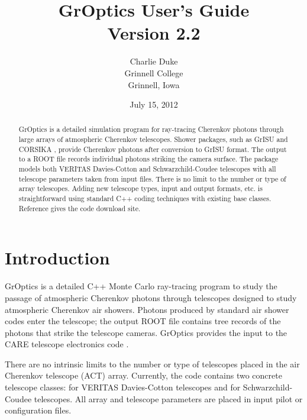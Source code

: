 \documentclass{article}
\begin{document}
\title{GrOptics User's Guide \\ Version 2.2}
\author{Charlie Duke \\
Grinnell College \\
Grinnell, Iowa }

\date{July 15, 2012}

\maketitle
\begin{abstract}

GrOptics is a detailed simulation program for ray-tracing Cherenkov photons
through large arrays of atmospheric Cherenkov telescopes. Shower packages, such
as GrISU \cite{GRISU} and CORSIKA \cite{CORSIKA}, provide Cherenkov 
photons after conversion to GrISU format. 
The output to a ROOT file records
individual photons striking the camera surface.  The package models
both VERITAS Davies-Cotton and Schwarzchild-Coudee telescopes with all
telescope parameters taken from input files. There is no limit to the number
or type of array telescopes. Adding new telescope types, input and
output formats, etc. is 
straightforward using standard C++ coding techniques with existing base
classes. Reference \cite{GROPTICS} gives the code download site.
       
\end{abstract}
\section{Introduction}\label{S:INTRO}
GrOptics is a detailed C++ Monte Carlo ray-tracing program to 
study the passage of 
atmospheric Cherenkov photons through telescopes designed to study 
atmospheric Cherenkov air showers.  
Photons produced by standard air shower 
codes enter the telescope; the output 
ROOT file contains tree records of the photons that strike the telescope
cameras.  GrOptics provides the input to the CARE  telescope 
electronics code \cite{CARE}.

There are no intrinsic limits to the number or type of telescopes placed in 
the air Cherenkov telescope (ACT) array. Currently, the code contains two 
concrete telescope 
classes: for VERITAS Davies-Cotton telescopes and for Schwarzchild-Coudee 
telescopes. All array and telescope parameters are placed in input pilot or
configuration files.   
\end{document}
